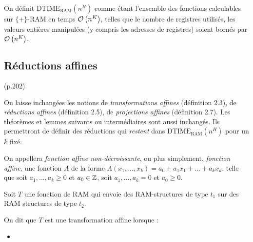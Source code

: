 \documentclass{article}
\newcommand{\dtimeram}{\text{DTIME}_{\text{RAM}}\left( n^H \right)}
\begin{document}
		
		\begin{definition}
			\label{def:temps_poly_RAM}
			On définit $\dtimeram$ comme étant l'ensemble des fonctions calculables sur $\{+\}$-RAM en temps $\mathcal{O}\left( n^K \right)$, telles que le nombre de registres utilisés, les valeurs entières manipulées (y compris les adresses de registres) soient bornés par $\mathcal{O}\left( n^K \right)$.
		\end{definition}
		
		
		
		\subsection{Réductions affines} (p.202)
			\label{subsec:reductions_affines}

		On laisse inchangées les notions de \emph{transformations affines} (définition 2.3), de \emph{réductions affines} (définition 2.5), de \emph{projections affines} (définition 2.7). Les théorèmes et lemmes suivants ou intermédiaires sont aussi inchangés. Ils permettront de définir des réductions qui \emph{restent} dans $\dtimeram$ pour un $k$ fixé. 
		
		\begin{definition}
			On appellera \emph{fonction affine non-décroissante}, ou plus simplement, \emph{fonction affine}, une fonction $A$ de la forme $A(x_1, \dots, x_k) = a_0 + a_1 x_1 + \dots + a_k x_k$, telle que soit $a_1, \dots, a_k \geqslant 0$ et $a_0 \in \mathbb{Z}$, soit $a_1, \dots, a_k = 0$ et $a_0 \geqslant 0$.
		\end{definition}
		
		\begin{definition}
			Soit $T$ une fonction de RAM qui envoie des RAM-structures de type $t_1$ sur des RAM structures de type $t_2$. 
			
			On dit que $T$ est une transformation affine lorsque : 
			
			
			\begin{itemize}[itemsep=-1mm]
				\item 	
			\end{itemize}
		\end{definition}
		
		
		
\end{document}
